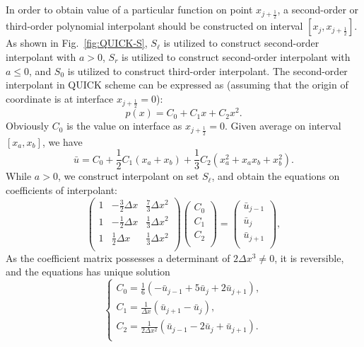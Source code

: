 \documentclass[]{article}
\def\Matrix#1{\left(#1\right)}
\def\jph{{j+\frac{1}{2}}}
\def\Matrix#1{\left(#1\right)}
\begin{document}
In order to obtain value of a particular function on point $x_\jph$, a 
second-order or third-order polynomial interpolant 
should be constructed on interval
$[x_j,x_\jph]$. As shown in Fig.~\ref{fig:QUICK-S}, $S_\ell$ is 
utilized to
construct second-order interpolant with $a>0$, $S_r$ is utilized to
construct second-order interpolant with $a\leq0$, and $S_0$ is utilized to
construct third-order interpolant. The second-order interpolant in QUICK scheme
can be expressed as (assuming that 
the origin of coordinate is at interface $x_\jph = 0$):
\begin{equation*}
p(x) = C_0 + C_1 x + C_2 x^2.
\end{equation*}
Obviously $C_0$ is the value on interface as $x_\jph=0$. Given average on
interval $[x_a, x_b]$, we have
\begin{equation*}
\bar u  =C_0+\frac{1}{2}C_1(x_a+x_b)+\frac{1}{3}C_2(x_a^2+x_ax_b+x_b^2).
\end{equation*}
While $a>0$, we construct interpolant on set $S_\ell$, and obtain the equations
on coefficients of interpolant:
\[
\Matrix{\begin{array}{crr}
1 & -\frac{3}{2}\Delta x & \frac{7}{3}\Delta x^2 \\
1 & -\frac{1}{2}\Delta x & \frac{1}{3}\Delta x^2 \\
1 &  \frac{1}{2}\Delta x & \frac{1}{3}\Delta x^2 \\
\end{array}}
\Matrix{\begin{array}{c} C_0 \\ C_1 \\ C_2 \\ \end{array}} =
\Matrix{\begin{array}{l} \bar u_{j-1} \\ \bar u_j \\ \bar u_{j+1} \\ \end{array}},
\]
As the coefficient matrix possesses a determinant of $2\Delta x^3\neq 0 $,
it is reversible, and the equations has unique solution
\[
\left\{\begin{array}{l}
\displaystyle
C_0=\frac{1}{6}(-\bar u_{j-1}+5\bar u_j+2\bar u_{j+1}),\\[3mm]
\displaystyle
C_1=\frac{1}{\Delta x}(\bar u_{j+1}-\bar u_j),\\[3mm]
\displaystyle
C_2=\frac{1}{2\Delta x^2}(\bar u_{j-1}-2\bar u_j+\bar u_{j+1}).\\
\end{array}\right.
\]
\end{document}
